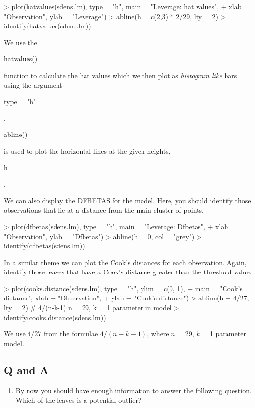 \documentclass[letterpaper,10pt]{article}
\newenvironment{rline}{\begin{small}\begin{ttfamily}}{\end{ttfamily}\end{small}}
\begin{document}
\begin{Schunk}
\begin{Sinput}
> plot(hatvalues(sdens.lm), type = "h", main = "Leverage: hat values",
+       xlab = "Observation", ylab = "Leverage")
> abline(h = c(2,3) * 2/29, lty = 2)
> identify(hatvalues(sdens.lm))
\end{Sinput}
\end{Schunk}

We use the \begin{rline}hatvalues()\end{rline} function to calculate the hat values which we then plot as \textit{histogram like} bars using the argument \begin{rline}type = "h"\end{rline}. \begin{rline}abline()\end{rline} is used to plot the horizontal lines at the given heights, \begin{rline}h\end{rline}.

We can also display the DFBETAS for the model. Here, you should identify those observations that lie at a distance from the main cluster of  points.

\begin{Schunk}
\begin{Sinput}
> plot(dfbetas(sdens.lm), type = "h", main = "Leverage: Dfbetas",
+       xlab = "Observation", ylab = "Dfbetas")
> abline(h = 0, col = "grey")
> identify(dfbetas(sdens.lm))
\end{Sinput}
\end{Schunk}

In a similar theme we can plot the Cook's distances for each observation. Again, identify those leaves that have a Cook's distance greater  than the threshold value.

\begin{Schunk}
\begin{Sinput}
> plot(cooks.distance(sdens.lm), type = "h", ylim = c(0, 1),
+       main = "Cook's distance", xlab = "Observation",
+       ylab = "Cook's distance")
> abline(h = 4/27, lty = 2) # 4/(n-k-1) n = 29, k = 1 parameter in model
> identify(cooks.distance(sdens.lm))
\end{Sinput}
\end{Schunk}


We use $4/27$ from the formulae $4/(n-k-1)$, where $n$ = 29, $k$ = 1 parameter model.

\subsection*{Q and A}
\begin{enumerate}
\item By now you should have enough information to answer the following question. Which of the leaves is a potential outlier?
\end{enumerate}
\end{document}
